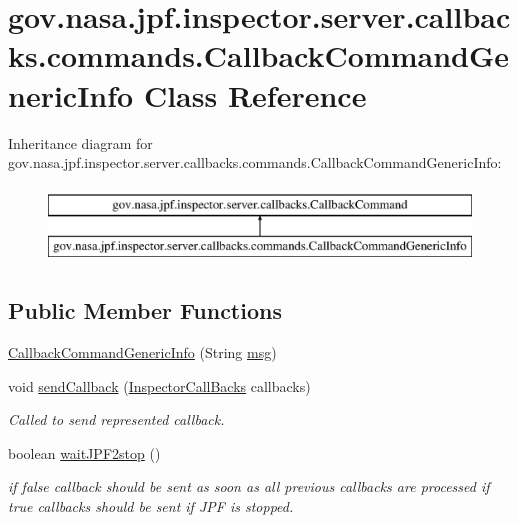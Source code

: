 \hypertarget{classgov_1_1nasa_1_1jpf_1_1inspector_1_1server_1_1callbacks_1_1commands_1_1_callback_command_generic_info}{}\section{gov.\+nasa.\+jpf.\+inspector.\+server.\+callbacks.\+commands.\+Callback\+Command\+Generic\+Info Class Reference}
\label{classgov_1_1nasa_1_1jpf_1_1inspector_1_1server_1_1callbacks_1_1commands_1_1_callback_command_generic_info}
Inheritance diagram for gov.\+nasa.\+jpf.\+inspector.\+server.\+callbacks.\+commands.\+Callback\+Command\+Generic\+Info\+:\begin{figure}[H]
\begin{center}
\leavevmode
\includegraphics[height=2.000000cm]{classgov_1_1nasa_1_1jpf_1_1inspector_1_1server_1_1callbacks_1_1commands_1_1_callback_command_generic_info}
\end{center}
\end{figure}
\subsection*{Public Member Functions}
\begin{DoxyCompactItemize}
\item 
\hyperlink{classgov_1_1nasa_1_1jpf_1_1inspector_1_1server_1_1callbacks_1_1commands_1_1_callback_command_generic_info_a3f08e9622507e785f5d8ad0a3a21b7d6}{Callback\+Command\+Generic\+Info} (String \hyperlink{classgov_1_1nasa_1_1jpf_1_1inspector_1_1server_1_1callbacks_1_1commands_1_1_callback_command_generic_info_a8abf18685ad4efcc4655476cd6340c2e}{msg})
\item 
void \hyperlink{classgov_1_1nasa_1_1jpf_1_1inspector_1_1server_1_1callbacks_1_1commands_1_1_callback_command_generic_info_a8a9547198a54b3807f0de2ed45cb2f9d}{send\+Callback} (\hyperlink{interfacegov_1_1nasa_1_1jpf_1_1inspector_1_1interfaces_1_1_inspector_call_backs}{Inspector\+Call\+Backs} callbacks)
\begin{DoxyCompactList}\small\item\em Called to send represented callback. \end{DoxyCompactList}\item 
boolean \hyperlink{classgov_1_1nasa_1_1jpf_1_1inspector_1_1server_1_1callbacks_1_1commands_1_1_callback_command_generic_info_a64bcc2fce69378fd551d98a25b0dd734}{wait\+J\+P\+F2stop} ()
\begin{DoxyCompactList}\small\item\em if false callback should be sent as soon as all previous callbacks are processed if true callbacks should be sent if J\+PF is stopped. \end{DoxyCompactList}\end{DoxyCompactItemize}
